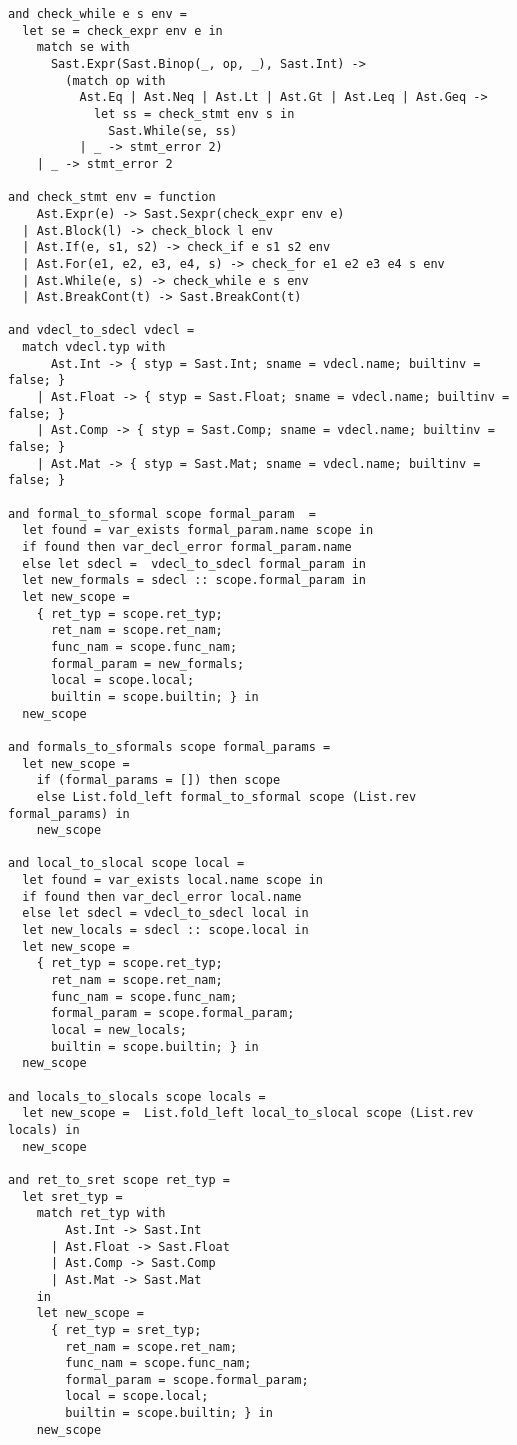 \begin{lstlisting}
and check_while e s env =
  let se = check_expr env e in
    match se with
      Sast.Expr(Sast.Binop(_, op, _), Sast.Int) ->
        (match op with
          Ast.Eq | Ast.Neq | Ast.Lt | Ast.Gt | Ast.Leq | Ast.Geq ->
            let ss = check_stmt env s in
              Sast.While(se, ss)
          | _ -> stmt_error 2)
    | _ -> stmt_error 2

and check_stmt env = function
    Ast.Expr(e) -> Sast.Sexpr(check_expr env e)
  | Ast.Block(l) -> check_block l env
  | Ast.If(e, s1, s2) -> check_if e s1 s2 env
  | Ast.For(e1, e2, e3, e4, s) -> check_for e1 e2 e3 e4 s env
  | Ast.While(e, s) -> check_while e s env
  | Ast.BreakCont(t) -> Sast.BreakCont(t)

and vdecl_to_sdecl vdecl =
  match vdecl.typ with
      Ast.Int -> { styp = Sast.Int; sname = vdecl.name; builtinv = false; }
    | Ast.Float -> { styp = Sast.Float; sname = vdecl.name; builtinv = false; }
    | Ast.Comp -> { styp = Sast.Comp; sname = vdecl.name; builtinv = false; }
    | Ast.Mat -> { styp = Sast.Mat; sname = vdecl.name; builtinv = false; }

and formal_to_sformal scope formal_param  =
  let found = var_exists formal_param.name scope in
  if found then var_decl_error formal_param.name
  else let sdecl =  vdecl_to_sdecl formal_param in
  let new_formals = sdecl :: scope.formal_param in
  let new_scope =
    { ret_typ = scope.ret_typ;
      ret_nam = scope.ret_nam;
      func_nam = scope.func_nam;
      formal_param = new_formals;
      local = scope.local; 
      builtin = scope.builtin; } in
  new_scope

and formals_to_sformals scope formal_params =
  let new_scope =
    if (formal_params = []) then scope
    else List.fold_left formal_to_sformal scope (List.rev formal_params) in
    new_scope

and local_to_slocal scope local =
  let found = var_exists local.name scope in
  if found then var_decl_error local.name
  else let sdecl = vdecl_to_sdecl local in
  let new_locals = sdecl :: scope.local in
  let new_scope =
    { ret_typ = scope.ret_typ;
      ret_nam = scope.ret_nam;
      func_nam = scope.func_nam;
      formal_param = scope.formal_param;
      local = new_locals; 
      builtin = scope.builtin; } in
  new_scope

and locals_to_slocals scope locals =
  let new_scope =  List.fold_left local_to_slocal scope (List.rev locals) in
  new_scope

and ret_to_sret scope ret_typ =
  let sret_typ = 
    match ret_typ with
        Ast.Int -> Sast.Int
      | Ast.Float -> Sast.Float
      | Ast.Comp -> Sast.Comp
      | Ast.Mat -> Sast.Mat
    in
    let new_scope =
      { ret_typ = sret_typ;
        ret_nam = scope.ret_nam;
        func_nam = scope.func_nam;
        formal_param = scope.formal_param;
        local = scope.local;
        builtin = scope.builtin; } in
    new_scope


\end{lstlisting}
